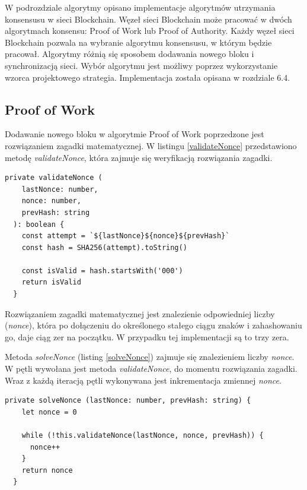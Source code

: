 \documentclass[a4paper,12pt]{book}
\begin{document}
W podrozdziale algorytmy opisano implementacje algorytmów utrzymania konsensusu w sieci Blockchain. Węzeł sieci Blockchain może pracować w dwóch algorytmach konsensu: Proof of Work lub Proof of Authority. Każdy węzeł sieci Blockchain pozwala na wybranie algorytmu konsensusu, w którym będzie pracował. Algorytmy różnią się sposobem dodawania nowego bloku i synchronizacją sieci. Wybór algorytmu jest możliwy poprzez wykorzystanie wzorca projektowego strategia. Implementacja została opisana w rozdziale 6.4.

\subsection{Proof of Work}

Dodawanie nowego bloku w algorytmie Proof of Work poprzedzone jest rozwiązaniem zagadki matematycznej. W listingu \ref{validateNonce} przedstawiono metodę \textit{validateNonce}, która zajmuje się weryfikacją rozwiązania zagadki.

\begin{lstlisting}[style=ES6, caption={Metoda \textit{validateNonce}.}, label={validateNonce}]
private validateNonce (
    lastNonce: number,
    nonce: number,
    prevHash: string
  ): boolean {
    const attempt = `${lastNonce}${nonce}${prevHash}`
    const hash = SHA256(attempt).toString()

    const isValid = hash.startsWith('000')
    return isValid
  }
\end{lstlisting}

Rozwiązaniem zagadki matematycznej jest znalezienie odpowiedniej liczby (\textit{nonce}), która po dołączeniu do określonego stałego ciągu znaków i zahashowaniu go, daje ciąg zer na początku. W przypadku tej implementacji są to trzy zera.

Metoda \textit{solveNonce} (listing \ref{solveNonce}) zajmuje się znalezieniem liczby \textit{nonce}. W pętli wywołana jest metoda \textit{validateNonce}, do momentu rozwiązania zagadki. Wraz z każdą iteracją pętli wykonywana jest inkrementacja zmiennej \textit{nonce}.

\begin{lstlisting}[style=ES6, caption={Metoda \textit{solveNonce}.}, label={solveNonce}]
private solveNonce (lastNonce: number, prevHash: string) {
    let nonce = 0

    while (!this.validateNonce(lastNonce, nonce, prevHash)) {
      nonce++
    }
    return nonce
  }
\end{lstlisting}
\end{document}
